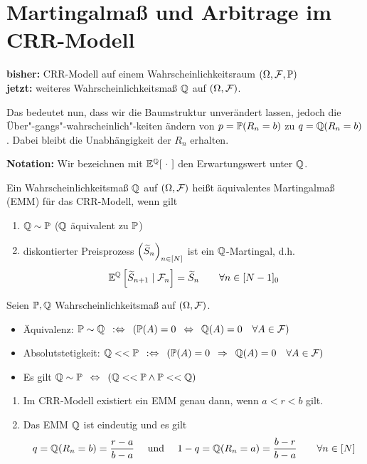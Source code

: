 \section{Martingalmaß und Arbitrage im CRR-Modell}

\textbf{bisher:} CRR-Modell auf einem Wahrscheinlichkeitsraum $(\Omega, \F, \P)$ \\
\textbf{jetzt:} weiteres Wahrscheinlichkeitsmaß $\Q$ auf $(\Omega, \F)$.

Das bedeutet nun, dass wir die Baumstruktur unverändert lassen, jedoch die Über"-gangs"-wahrscheinlich"-keiten ändern von $p = \P(R_n = b)$ zu $q = \Q(R_n = b)$. Dabei bleibt die Unabhängigkeit der $R_n$ erhalten.

\textbf{Notation:} Wir bezeichnen mit $\E^\Q[\ \cdot \ ]$ den Erwartungswert unter $\Q$.

\begin{*definition}
	Ein Wahrscheinlichkeitsmaß $\Q$ auf $(\Omega, \F)$ heißt äquivalentes Martingalmaß (EMM) für das CRR-Modell, wenn gilt
	\begin{enumerate}
		\item $\Q \sim \P$ ($\Q$ äquivalent zu $\P$)
		\item diskontierter Preisprozess $\folge{\schlange{S}_n}{n \in [N]}$ ist ein $\Q$-Martingal, d.h.
		\begin{equation*}
		\E^\Q \sqbrackets{\schlange{S}_{n+1} \mid \F_n} = \schlange{S}_n \qquad \forall n \in [N-1]_0
		\end{equation*}
	\end{enumerate}
\end{*definition}

\begin{*bemerkung_inline}
	Seien $\P, \Q$ Wahrscheinlichkeitsmaß auf $(\Omega, \F)$.
	\begin{itemize}
		\item Äquivalenz: $\P \sim \Q \defequiv \brackets{\P(A) = 0 \equivalent \Q(A) = 0 \quad \forall A \in \F}$
		\item Absolutstetigkeit: $\Q << \P  \defequiv \brackets{\P(A) = 0 \follows \Q(A) = 0 \quad \forall A \in \F}$
		\item Es gilt $\Q \sim \P \equivalent \brackets{\Q << \P \land \P << \Q}$
	\end{itemize}
\end{*bemerkung_inline}

\begin{theorem}
	\begin{enumerate}[label=(\alph*)]
		\item Im CRR-Modell existiert ein EMM genau dann, wenn $a < r < b$ gilt.
		\item Das EMM $\Q$ ist eindeutig und es gilt
		\begin{align*}
			q = \Q(R_n = b) = \frac{r-a}{b-a} \quad \und \quad 1-q = \Q(R_n = a) = \frac{b-r}{b-a} \qquad \forall n \in [N]
		\end{align*}
	\end{enumerate}
\end{theorem}

